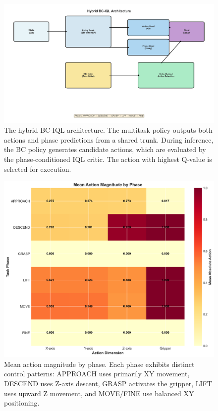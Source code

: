 \documentclass[conference]{IEEEtran}
\begin{document}
\begin{figure}[t]
\centering
\includegraphics[width=\columnwidth]{architecture_diagram.png}
\caption{The hybrid BC-IQL architecture. The multitask policy outputs both actions and phase predictions from a shared trunk. During inference, the BC policy generates candidate actions, which are evaluated by the phase-conditioned IQL critic. The action with highest Q-value is selected for execution.}
\label{fig:hybrid_model}
\end{figure}

\begin{figure}[t]
\centering
\includegraphics[width=\columnwidth]{phase_action_heatmap.png}
\caption{Mean action magnitude by phase. Each phase exhibits distinct control patterns: APPROACH uses primarily XY movement, DESCEND uses Z-axis descent, GRASP activates the gripper, LIFT uses upward Z movement, and MOVE/FINE use balanced XY positioning.}
\label{fig:phase_heatmap}
\end{figure}
\end{document}
